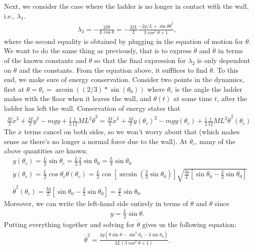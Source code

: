 \documentclass{article}
\theoremstyle{definition}
\newcommand{\f}[2]{\frac{#1}{#2}}
\newcommand{\lp}{\left(}
\newcommand{\rp}{\right)}
\newcommand{\lb}{\left[}
\newcommand{\rb}{\right]}
\begin{document}
\begin{enumerate}[label = (\alph*)]
		Next, we consider the case where the ladder is no longer in contact with the wall, i.e., $\lambda_1$. 
		\begin{align*}
		\lambda_2 = -\f{2I\ddot\theta}{L\cos\theta} = -\f{ML}{2}\f{-2g/L + \sin\theta \dot\theta^2}{3\cos^2\theta+1},
		\end{align*} 
		where the second equality is obtained by plugging in the equation of motion for $\theta$. We want to do the same thing as previously, that is to express $\dot\theta$ and $\ddot\theta$ in terms of the known constants and $\theta$ so that the final expression for $\lambda_2$ is only dependent on $\theta$ and the constants. From the equation above, it sufffices to find $\dot\theta$. To this end, we make sure of energy conservation. Consider two points in the dynamics, first at $\theta = \theta_c = \arcsin((2/3)*\sin(\theta_0))$ where $\theta_c$ is the angle the ladder makes with the floor when it leaves the wall, and $\theta(t)$ at some time $t$, after the ladder has left the wall. Conservation of energy states that
		\begin{align*}
		\f{M}{2}\dot x^2 + \f{M}{2}\dot y^2 - mgy + \f{1}{2}\f{1}{12}ML^2 \dot\theta^2 = \f{M}{2}\dot x^2 + \f{M}{2}\dot y(\theta_c)^2 - mgy(\theta_c) + \f{1}{2}\f{1}{12}ML^2 \dot\theta^2(\theta_c)
		\end{align*}
		The $\dot{x}$ terms cancel on both sides, so we won't worry about that (which makes sense as there's no longer a normal force due to the wall). At $\theta_c$, many of the above quantities are known: 
		\begin{align*}
		&y(\theta_c) = \f{L}{2}\sin\theta_c = \f{L}{2}\f{2}{3}\sin\theta_0 = \f{L}{3}\sin\theta_0\\
		&\dot y(\theta_c) = \f{L}{2}\cos\theta_c \dot\theta(\theta_c) = \f{L}{2}\cos\lb \arcsin\lp \f{2}{3}\sin\theta_0 \rp \rb \sqrt{\f{3g}{L}\lb \sin\theta_0 - \f{2}{3}\sin\theta_0\rb}\\
		&\dot\theta^2(\theta_c) = \f{3g}{L}\lb \sin\theta_0 - \f{2}{3}\sin\theta_0\rb = \f{g}{L}\sin\theta_0.
		\end{align*}
		Moreover, we can write the left-hand side entirely in terms of $\dot \theta$ and $\theta$ since
		\begin{align*}
		y =  \f{L}{2}\sin\theta.
		\end{align*}
		Putting everything together and solving for $\dot\theta$ gives us the following equation:
		\begin{align*}
		\dot\theta^2 = \frac{4g \left(9 \sin\theta-\sin ^3\theta_0-3 \sin\theta_0\right)}{3L \left(3 \cos ^2\theta+1\right)}.

\end{align*}
\end{enumerate}
\end{document}
